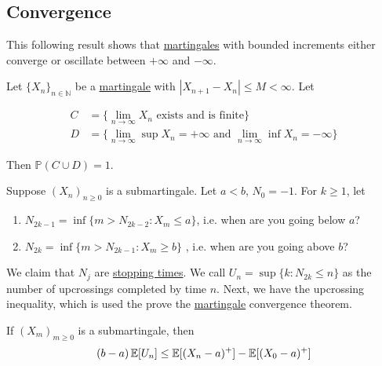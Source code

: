 	\subsection{Convergence}

  This following result shows that \hyperref[def:martingale]{martingales} with bounded increments either converge or oscillate between $+\infty$ and $-\infty$. 

  \begin{theorem}
    \label{thm:martingale-convergence-under-bounded-increments}
    Let $\{X_n\}_{n \in \mathbb{N}}$ be a \hyperref[def:martingale]{martingale} with $|X_{n+1} - X_n| \leq M < \infty$. Let 

    \begin{align*}
      C & = \{\lim_{n \rightarrow \infty} X_n \text{ exists and is finite}\} \\
      D & = \{\lim_{n \rightarrow \infty} \sup X_n = +\infty \text{ and } \lim_{n \rightarrow \infty} \inf X_n = -\infty\}
    \end{align*}

    Then $\mathbb{P}(C \cup D) = 1$. 
  \end{theorem}

	\begin{example}
	  \label{ex:upcrossing-times-of-a-submartingale}
		Suppose $(X_n)_{n \geq 0}$ is a submartingale. Let $a < b$, $N_0 = -1$. For $k \geq 1$, let 
		\begin{enumerate}
			\item $N_{2k-1} = \inf\{m > N_{2k-2} \colon X_m \leq a \}$, i.e. when are you going below $a$? 
			\item $N_{2k} = \inf \{m > N_{2k-1} \colon X_m \geq b \}$ , i.e. when are you going above $b$? 
		\end{enumerate}
		We claim that $N_j$ are \hyperref[def:stopping-time]{stopping times}. We call $U_n = \sup \{k \colon N_{2k} \leq n\}$ as the number of upcrossings completed by time $n$. Next, we have the upcrossing inequality, which is used the prove the \hyperref[def:martingale]{martingale} convergence theorem.  
	\end{example}

	\begin{theorem}
	  \label{thm:upcrossing-inequality}
		If $(X_m)_{m \geq 0}$ is a submartingale, then 
		\begin{equation}
			(b - a) \operatorname{\mathbb{E}}[U_n] \leq \operatorname{\mathbb{E}}[(X_n - a)^+] - \operatorname{\mathbb{E}}[(X_0 - a)^+]
		\end{equation}
	\end{theorem}

